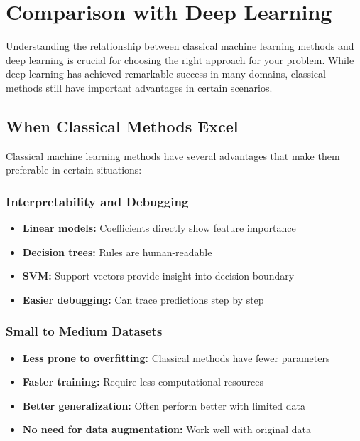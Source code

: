 
\section{Comparison with Deep Learning }
\label{sec:comparison}

Understanding the relationship between classical machine learning methods and deep learning is crucial for choosing the right approach for your problem. While deep learning has achieved remarkable success in many domains, classical methods still have important advantages in certain scenarios.

\subsection{When Classical Methods Excel}

Classical machine learning methods have several advantages that make them preferable in certain situations:

\subsubsection{Interpretability and Debugging}
\begin{itemize}
    \item \textbf{Linear models:} Coefficients directly show feature importance
    \item \textbf{Decision trees:} Rules are human-readable
    \item \textbf{SVM:} Support vectors provide insight into decision boundary
    \item \textbf{Easier debugging:} Can trace predictions step by step
\end{itemize}

\subsubsection{Small to Medium Datasets}
\begin{itemize}
    \item \textbf{Less prone to overfitting:} Classical methods have fewer parameters
    \item \textbf{Faster training:} Require less computational resources
    \item \textbf{Better generalization:} Often perform better with limited data
    \item \textbf{No need for data augmentation:} Work well with original data
\end{itemize}

